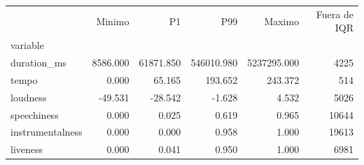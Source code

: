 \begin{tabular}{lrrrrr}
\toprule
 & Minimo & P1 & P99 & Maximo & Fuera de IQR \\
variable &  &  &  &  &  \\
\midrule
duration\_ms & 8586.000 & 61871.850 & 546010.980 & 5237295.000 & 4225 \\
tempo & 0.000 & 65.165 & 193.652 & 243.372 & 514 \\
loudness & -49.531 & -28.542 & -1.628 & 4.532 & 5026 \\
speechiness & 0.000 & 0.025 & 0.619 & 0.965 & 10644 \\
instrumentalness & 0.000 & 0.000 & 0.958 & 1.000 & 19613 \\
liveness & 0.000 & 0.041 & 0.950 & 1.000 & 6981 \\
\bottomrule
\end{tabular}

